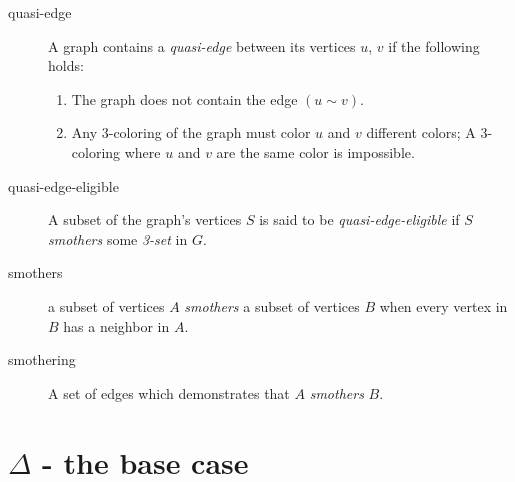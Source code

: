\documentclass{article}
\begin{document}
\begin{description}
\item[quasi-edge] A graph contains a \emph{quasi-edge} between its vertices $u$, $v$ if the following holds:
    \begin{enumerate}
    \item The graph does not contain the edge $(u \sim v)$.
    \item Any 3-coloring of the graph must color $u$ and $v$ different colors; A 3-coloring where $u$ and $v$ are the same color is impossible.
    \end{enumerate}

\item[quasi-edge-eligible] A subset of the graph's vertices $S$ is said to be \emph{quasi-edge-eligible} if $S$ \emph{smothers} some \emph{3-set} in $G$.

\item[smothers] a subset of vertices $A$ \emph{smothers} a subset of vertices $B$ when every vertex in $B$ has a neighbor in $A$.

\item[smothering] A set of edges which demonstrates that $A$ \emph{smothers} $B$.

\end{description}

\section{$\Delta$ - the base case}
\end{document}
